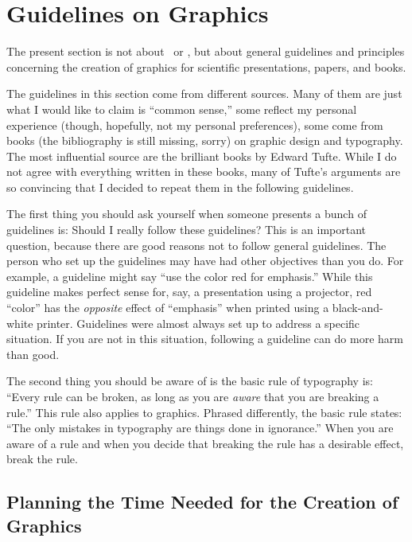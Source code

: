 %
%
%


\section{Guidelines on Graphics}

The present section is not about \pgfname\ or \tikzname, but about general
guidelines and principles concerning the creation of graphics for scientific
presentations, papers, and books.

The guidelines in this section come from different sources. Many of them are
just what I would like to claim is ``common sense,'' some reflect my personal
experience (though, hopefully, not my personal preferences), some come from
books (the bibliography is still missing, sorry) on graphic design and
typography. The most influential source  are the brilliant books by Edward
Tufte. While I do not agree with everything written in these books, many of
Tufte's arguments are so convincing that I decided to repeat them in the
following guidelines.

The first thing you should ask yourself when someone presents a bunch of
guidelines is: Should I really follow these guidelines? This is an important
question, because there are good reasons not to follow general guidelines.  The
person who set up the guidelines may have had other objectives than you do. For
example, a guideline might say ``use the color red for emphasis.'' While this
guideline makes perfect sense for, say, a presentation using a projector, red
``color'' has the \emph{opposite} effect of ``emphasis'' when printed using a
black-and-white printer. Guidelines were almost always set up to address a
specific situation. If you are not in this situation, following a guideline can
do more harm than good.

The second thing you should be aware of is the basic rule of typography is:
``Every rule can be broken, as long as you are \emph{aware} that you are
breaking a rule.'' This rule also applies to graphics. Phrased differently, the
basic rule states: ``The only mistakes in typography are things done in
ignorance.''  When you are aware of a rule and when you decide that breaking
the rule has a desirable effect, break the rule.


\subsection{Planning the Time Needed for the Creation of Graphics}

